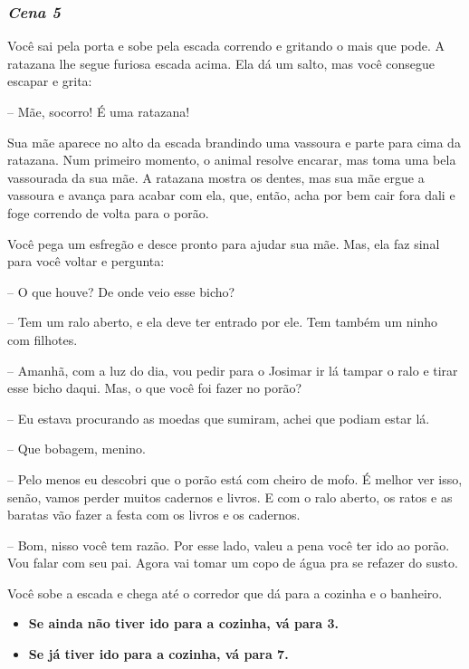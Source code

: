 \bigskip\medskip

\subsubsection{\textit{\textbf{Cena 5}}}
Você sai pela porta e sobe pela escada correndo e gritando o mais que pode. A ratazana lhe segue furiosa escada acima. Ela dá um salto, mas você consegue escapar e grita:

-- Mãe, socorro! É uma ratazana!

Sua mãe aparece no alto da escada brandindo uma vassoura e parte para cima da ratazana. Num primeiro momento, o animal resolve encarar, mas toma uma bela vassourada da sua mãe. A ratazana mostra os dentes, mas sua mãe ergue a vassoura e avança para acabar com ela, que, então, acha por bem cair fora dali e foge correndo de volta para o porão.

Você pega um esfregão e desce pronto para ajudar sua mãe. Mas, ela faz sinal para você voltar e pergunta:

-- O que houve? De onde veio esse bicho?

-- Tem um ralo aberto, e ela deve ter entrado por ele. Tem também um ninho com filhotes.

-- Amanhã, com a luz do dia, vou pedir para o Josimar ir lá tampar o ralo e tirar esse bicho daqui. Mas, o que você foi fazer no porão?

-- Eu estava procurando as moedas que sumiram, achei que podiam estar lá.

-- Que bobagem, menino.

-- Pelo menos eu descobri que o porão está com cheiro de mofo. É melhor ver isso, senão, vamos perder muitos cadernos e livros. E com o ralo aberto, os ratos e as baratas vão fazer a festa com os livros e os cadernos.

-- Bom, nisso você tem razão. Por esse lado, valeu a pena você ter ido ao porão. Vou falar com seu pai. Agora vai tomar um copo de água pra se refazer do susto.

Você sobe a escada e chega até o corredor que dá para a cozinha e o banheiro.

\begin{itemize}
	\item \textbf{Se ainda não tiver ido para a cozinha, vá para 3.}
	\item \textbf{Se já tiver ido para a cozinha, vá para 7.}
\end{itemize}


